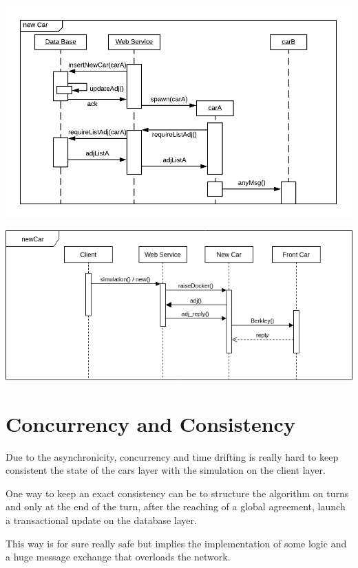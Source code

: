 \begin{center}
    \includegraphics[scale=0.8]{assets/ds2019_1.png}
\end{center}

\begin{center}
    \includegraphics[scale=0.6]{assets/newCar.png}
\end{center}



\section{Concurrency and Consistency}

Due to the asynchronicity, concurrency and time drifting is really hard 
to keep consistent the state of the cars layer with the simulation 
on the client layer. 

One way to keep an exact consistency can be to structure the algorithm on 
turns and only at the end of the turn, after the reaching of a global agreement,
launch a transactional update on the database layer. 

This way is for sure really safe but implies the implementation of some logic 
and a huge message exchange that overloads the network.

